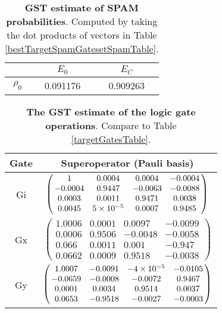 {\begin{table}[h]
\begin{center}
\begin{tabular}[l]{|c|c|c|}
\hline
 & $E_{0}$ & $E_C$ \\ \hline
$\rho_{0}$ & 0.091176 & 0.909263 \\ \hline
\end{tabular}

\caption{\textbf{GST estimate of SPAM probabilities}.  Computed by taking the dot products of vectors in Table \ref{bestTargetSpamGatesetSpamTable}.\label{bestTargetSpamGatesetSpamParametersTable}}
\end{center}
\end{table}

\begin{table}[h]
\begin{center}
\begin{tabular}[l]{|c|c|}
\hline
Gate & Superoperator (Pauli basis) \\ \hline
Gi & $ \left(\!\!\begin{array}{cccc}
1 & 0.0004 & 0.0004 & -0.0004 \\ 
-0.0004 & 0.9447 & -0.0063 & -0.0088 \\ 
0.0003 & 0.0011 & 0.9471 & 0.0038 \\ 
0.0045 & 5\times 10^{-5} & 0.0007 & 0.9485
 \end{array}\!\!\right) $
 \\ \hline
Gx & $ \left(\!\!\begin{array}{cccc}
1.0006 & 0.0001 & 0.0097 & -0.0099 \\ 
0.0006 & 0.9506 & -0.0048 & -0.0058 \\ 
0.066 & 0.0011 & 0.001 & -0.947 \\ 
0.0662 & 0.0009 & 0.9518 & -0.0038
 \end{array}\!\!\right) $
 \\ \hline
Gy & $ \left(\!\!\begin{array}{cccc}
1.0007 & -0.0091 & -4\times 10^{-5} & -0.0105 \\ 
-0.0659 & -0.0008 & -0.0072 & 0.9467 \\ 
0.0001 & 0.0034 & 0.9514 & 0.0037 \\ 
0.0653 & -0.9518 & -0.0027 & -0.0003
 \end{array}\!\!\right) $
 \\ \hline
\end{tabular}

\caption{\textbf{The GST estimate of the logic gate operations}.  Compare to Table \ref{targetGatesTable}.\label{bestTargetSpamGatesetGatesTable}}
\end{center}
\end{table}

}
